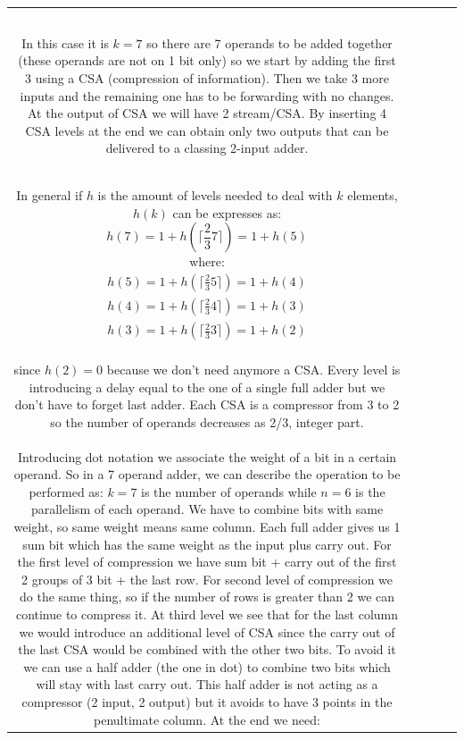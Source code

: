 \begin{center}
\begin{tabular}{|c|c|c|c|c|}
\begin{verbatim}
\end{verbatim}
In this case it is $k=7$ so there are 7 operands to be added together (these operands are not on 1 bit only) so we start by adding the first 3 using a CSA (compression of information). Then we take 3 more inputs and the remaining one has to be forwarding with no changes. At the output of CSA we will have 2 stream/CSA. By inserting 4 CSA levels at the end we can obtain only two outputs that can be delivered to a classing 2-input adder.\\

In general if $h$ is the amount of levels needed to deal with $k$ elements, $h(k)$ can be expresses as:
$$h(7)=1+h(\lceil \frac{2}{3}7 \rceil )=1+h(5)$$
where:
\begin{eqnarray}
h(5)=1+h(\lceil \frac{2}{3}5 \rceil )=1+h(4)\\
h(4)=1+h(\lceil \frac{2}{3}4 \rceil )=1+h(3)\\
h(3)=1+h(\lceil \frac{2}{3}3 \rceil )=1+h(2)\\
\end{eqnarray}

since $h(2)=0$ because we don't need anymore a CSA. Every level is introducing a delay equal to the one of a single full adder but we don't have to forget last adder.
Each CSA is a compressor from 3 to 2 so the number of operands decreases as 2/3, integer part.\\

Introducing dot notation we associate the weight of a bit in a certain operand. So in a 7 operand adder, we can describe the operation to be performed as:
$k=7$ is the number of operands while $n=6$ is the parallelism of each operand.
We have to combine bits with same weight, so same weight means same column. Each full adder gives us 1 sum bit which has the same weight as the input plus carry out. For the first level of compression we have sum bit + carry out of the first 2 groups of 3 bit + the last row.
For second level of compression we do the same thing, so if the number of rows is greater than 2 we can continue to compress it.
At third level we see that for the last column we would introduce an additional level of CSA since the carry out of the last CSA would be combined with the other two bits. To avoid it we can use a half adder (the one in dot) to combine two bits which will stay with last carry out. This half adder is not acting as a compressor (2 input, 2 output) but it avoids to have 3 points in the penultimate column. At the end we need:


\end{tabular}
\end{center}
